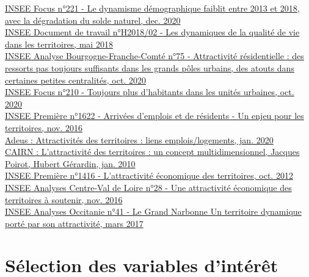 \documentclass{article}
\begin{document}
\noindent
[1] \href{https://www.insee.fr/fr/statistiques/4999744}{INSEE Focus n°221 - Le dynamisme démographique faiblit entre 2013 et 2018, avec la dégradation du solde naturel, dec. 2020}
\\
\noindent
[2] \href{https://www.insee.fr/fr/statistiques/3545995}{INSEE Document de travail n°H2018/02 - Les dynamiques de la qualité de vie dans les territoires, mai 2018}
\\
\noindent
[3] \href{https://www.insee.fr/fr/statistiques/4768297}{INSEE Analyse Bourgogne-Franche-Comté n°75 - Attractivité résidentielle : des ressorts pas toujours suffisants dans les grands pôles urbains, des atouts dans certaines petites centralités, oct. 2020}
\\
\noindent
[4] \href{https://www.insee.fr/fr/statistiques/4806684}{INSEE Focus n°210 - Toujours plus d’habitants dans les unités urbaines, oct. 2020}
\\
\noindent
[5] \href{https://www.insee.fr/fr/statistiques/2411498}{INSEE Première n°1622 - Arrivées d'emplois et de résidents - Un enjeu pour les territoires, nov. 2016}
\\
\noindent
[6] \href{http://www.adeus.org/productions/attractivites-des-territoires-du-grand-est-liens-emplois-logements/files/attractivites_territoires_synthese_action_logement.pdf}{Adeus : Attractivités des territoires : liens emplois/logements, jan. 2020} 
\\
\noindent
[7] \href{https://www.cairn.info/revue-mondes-en-developpement-2010-1-page-27.htm\#s2n2}{CAIRN : L'attractivité des territoires : un concept multidimensionnel, Jacques Poirot, Hubert Gérardin, jan. 2010}
\\
\noindent
[8] \href{https://www.insee.fr/fr/statistiques/1281062}{INSEE Première n°1416 - L'attractivité économique des territoires,  oct. 2012}
\\
\noindent
[9] \href{https://www.insee.fr/fr/statistiques/2422226}{INSEE Analyses Centre-Val de Loire n°28 - Une attractivité économique des territoires à soutenir, nov. 2016}
\\
\noindent
 [10] \href{https://www.insee.fr/fr/statistiques/2663749}{INSEE Analyses Occitanie n°41 - Le Grand Narbonne Un territoire dynamique porté par son attractivité, mars 2017}

\newpage

\section{Sélection des variables d'intérêt}
\end{document}
